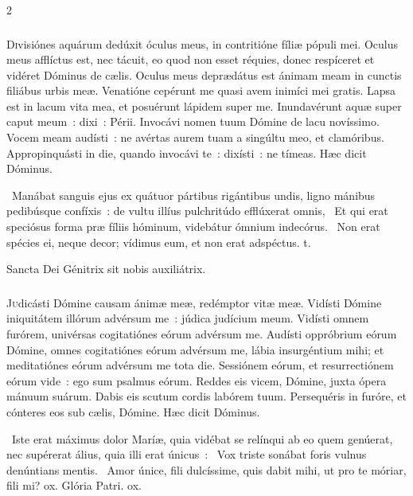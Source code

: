 \documentclass[9pt,twoside]{extarticle}
\begin{document}
\begin{multicols}{2}
\subsubsection*{\center {}}
\lettrine{D}ivisiónes aquárum dedúxit óculus meus, in contritióne fíliæ pópuli mei.
Oculus meus afflíctus est, nec tácuit, eo quod non esset réquies,
donec respíceret et vidéret Dóminus de cælis.
Oculus meus deprædátus est ánimam meam in cunctis filiábus urbis meæ.
Venatióne cepérunt me quasi avem inimíci mei gratis.
Lapsa est in lacum vita mea, et posuérunt lápidem super me.
Inundavérunt aquæ super caput meum~: dixi~: Périi.
Invocávi nomen tuum Dómine de lacu novíssimo.
Vocem meam audísti~: ne avértas aurem tuam a singúltu meo, et clamóribus.
Appropinquásti in die, quando invocávi te~: dixísti~: ne tímeas. Hæc dicit Dóminus.

\begin{tightlist}{}
\item {}~Manábat sanguis ejus ex quátuor pártibus rigántibus undis, ligno mánibus pedibúsque confíxis~: de vultu illíus pulchritúdo efflúxerat omnis, \textred{*}~Et qui erat speciósus forma præ fíliis hóminum, videbátur ómnium indecórus. ~Non erat spécies ei, neque decor; vídimus eum, et non erat adspéctus. t.
\item {\small {} Sancta Dei Génitrix sit nobis auxiliátrix.}
\end{tightlist}

\subsubsection*{\center {}}
\lettrine{J}udicásti Dómine causam ánimæ meæ, redémptor vitæ meæ.
Vidísti Dómine iniquitátem illórum advérsum me~: júdica judícium meum.
Vidísti omnem furórem, univérsas cogitatiónes eórum advérsum me.
Audísti oppróbrium eórum Dómine, omnes cogitatiónes eórum advérsum me,
lábia insurgéntium mihi; et meditatiónes eórum advérsum me tota die.
Sessiónem eórum, et resurrectiónem eórum vide~: ego sum psalmus eórum.
Reddes eis vicem, Dómine, juxta ópera mánuum suárum.
Dabis eis scutum cordis labórem tuum.
Persequéris in furóre, et cónteres eos sub cælis, Dómine. Hæc dicit Dóminus.

\begin{tightlist}{}
\item {}~Iste erat máximus dolor Maríæ, quia vidébat se relínqui ab eo quem genúerat, nec supérerat álius, quia illi erat únicus~: \textred{*}~Vox triste sonábat foris vulnus denúntians mentis. ~Amor únice, fili dulcíssime, quis dabit mihi, ut pro te móriar, fili mi? ox. Glória Patri. ox.
\end{tightlist}


\end{multicols}
\end{document}

